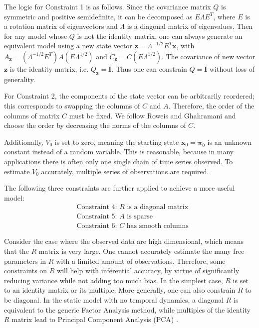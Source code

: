 \documentclass[fleqn,12pt]{article}
\providecommand{\mb}[1]{\boldsymbol{#1}}
\newcommand{\bx}{\mb{x}}
\begin{document}
The logic for Constraint 1 is as follows. Since the covariance matrix $Q$ is symmetric and positive semidefinite, it can be decomposed as $E\Lambda E^T$, where $E$ is a rotation matrix of eigenvectors and $\Lambda$ is a diagonal matrix of eigenvalues. Then for any model whose $Q$ is not the identity matrix, one can always generate an equivalent model using a new state vector $\mathbf{z}=\Lambda^{-1/2} E^T \bx$, with $A_{\mathbf{z}}=(\Lambda^{-1/2}E^T)A(E\Lambda^{1/2})$ and $C_{\mathbf{z}}=C(E\Lambda^{1/2})$. The covariance of new vector $\mathbf{z}$ is the identity matrix, i.e. $Q_{\mathbf{z}}=\mathbf{I}$. Thus one can constrain $Q=\mathbf{I}$ without loss of generality.

For Constraint 2, the components of the state vector can be arbitrarily reordered; this corresponds to swapping the columns of $C$ and $A$. Therefore, the order of the columns of matrix $C$ must be fixed. We follow Roweis and Ghahramani and choose the order by decreasing the norms of the columns of $C$.

Additionally, $V_0$ is set to zero, meaning the starting state $\bx_0=\mathbf{\pi}_0$ is an unknown constant instead of a random variable. This is reasonable, because in many applications there is often only one single chain of time series observed. To estimate $V_0$ accurately, multiple series of observations are required.

The following three constraints are further applied to achieve a more useful model:
\vspace*{-3mm}
\begin{equation*}\label{eqn:constraints2}
\begin{aligned}
&\text{Constraint 4: }R\text{ is a diagonal matrix}\\
&\text{Constraint 5: }A\text{ is sparse}\\
&\text{Constraint 6: }C\text{ has smooth columns}
\end{aligned}
\end{equation*}

Consider the case where the observed data are high dimensional, which means that the  $R$ matrix is very large. One cannot accurately estimate the many free parameters in $R$ with a limited amount of observations. Therefore, some constraints on $R$ will help with inferential accuracy, by virtue of significantly reducing variance while not adding too much bias. In the simplest case, $R$ is set to an identity matrix or its multiple. More generally, one can also constrain $R$ to be diagonal. In the static model with no temporal dynamics, a diagonal $R$ is equivalent to the generic Factor Analysis method, while multiples of the identity $R$ matrix lead to Principal Component Analysis (PCA) \citep{roweis1999unifying}.
%
%
%
\end{document}
